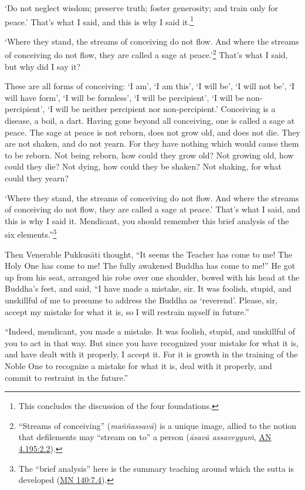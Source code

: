 \documentclass[12pt,openany]{book}%
\begin{document}
‘Do not neglect wisdom; preserve truth; foster generosity; and train only for peace.’ That’s what I said, and this is why I said it.\footnote{This concludes the discussion of the four foundations. } 

‘Where they stand, the streams of conceiving do not flow. And where the streams of conceiving do not flow, they are called a sage at peace.’\footnote{“Streams of conceiving” (\textit{\textsanskrit{maññassavā}}) is a unique image, allied to the notion that defilements may “stream on to” a person (\textit{\textsanskrit{āsavā} \textsanskrit{assaveyyuṁ}}, \href{https://suttacentral.net/an4.195/en/sujato\#2.2}{AN 4.195:2.2}). } That’s what I said, but why did I say it? 

These are all forms of conceiving: ‘I am’, ‘I am this’, ‘I will be’, ‘I will not be’, ‘I will have form’, ‘I will be formless’, ‘I will be percipient’, ‘I will be non-percipient’, ‘I will be neither percipient nor non-percipient.’ Conceiving is a disease, a boil, a dart. Having gone beyond all conceiving, one is called a sage at peace. The sage at peace is not reborn, does not grow old, and does not die. They are not shaken, and do not yearn. For they have nothing which would cause them to be reborn. Not being reborn, how could they grow old? Not growing old, how could they die? Not dying, how could they be shaken? Not shaking, for what could they yearn? 

‘Where they stand, the streams of conceiving do not flow. And where the streams of conceiving do not flow, they are called a sage at peace.’ That’s what I said, and this is why I said it. Mendicant, you should remember this brief analysis of the six elements.”\footnote{The “brief analysis” here is the summary teaching around which the sutta is developed (\href{https://suttacentral.net/mn140/en/sujato\#7.4}{MN 140:7.4}). } 

Then Venerable \textsanskrit{Pukkusāti} thought, “It seems the Teacher has come to me! The Holy One has come to me! The fully awakened Buddha has come to me!” He got up from his seat, arranged his robe over one shoulder, bowed with his head at the Buddha’s feet, and said, “I have made a mistake, sir. It was foolish, stupid, and unskillful of me to presume to address the Buddha as ‘reverend’. Please, sir, accept my mistake for what it is, so I will restrain myself in future.” 

“Indeed, mendicant, you made a mistake. It was foolish, stupid, and unskillful of you to act in that way. But since you have recognized your mistake for what it is, and have dealt with it properly, I accept it. For it is growth in the training of the Noble One to recognize a mistake for what it is, deal with it properly, and commit to restraint in the future.” 
\end{document}
